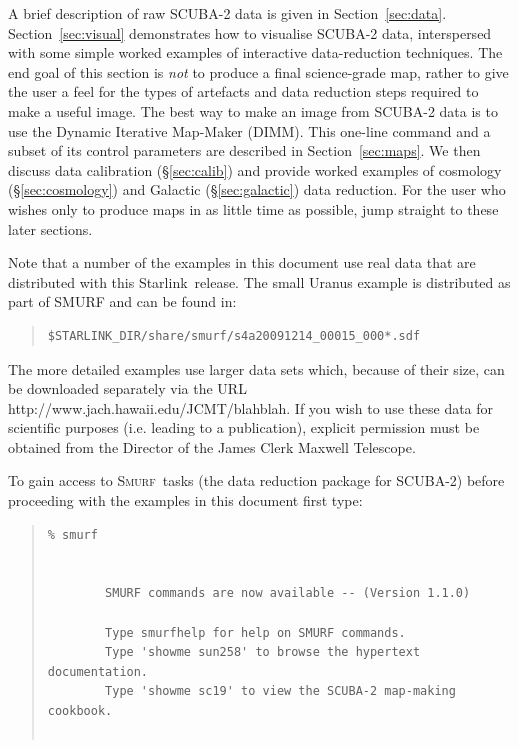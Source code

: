 \documentclass[twoside,11pt]{article}
\newcommand{\htmladdnormallink}[2]{#1}
\newcommand{\xref}[3]{#1}
\renewcommand{\_}{\texttt{\symbol{95}}}
\newenvironment{myquote}{\begin{quote}\begin{small}}{\end{small}\end{quote}}
\newcommand{\starlink}{\htmladdnormallink{Starlink}{http://starlink.jach.hawaii.edu}}
\newcommand{\smurf}{\xref{\textsc{Smurf}}{sun258}{}}
\begin{document}
A brief description of raw SCUBA-2 data is given in
Section~\ref{sec:data}. Section~\ref{sec:visual} demonstrates how to
visualise SCUBA-2 data, interspersed with some simple worked examples
of interactive data-reduction techniques. The end goal of this section
is {\em not} to produce a final science-grade map, rather to give the
user a feel for the types of artefacts and data reduction steps
required to make a useful image. The best way to make an image from
SCUBA-2 data is to use the Dynamic Iterative Map-Maker (DIMM). This
one-line command and a subset of its control parameters are described
in Section~\ref{sec:maps}. We then discuss data calibration
(\S\ref{sec:calib}) and provide worked examples of cosmology
(\S\ref{sec:cosmology}) and Galactic (\S\ref{sec:galactic}) data
reduction. For the user who wishes only to produce maps in as little
time as possible, jump straight to these later sections.

Note that a number of the examples in this document use real data that
are distributed with this \starlink\ release. The small Uranus example
is distributed as part of SMURF and can be found in:

\begin{myquote}
\begin{verbatim}
$STARLINK_DIR/share/smurf/s4a20091214_00015_000*.sdf
\end{verbatim}
\end{myquote}

The more detailed examples use larger data sets which, because of
their size, can be downloaded separately via the URL
\htmladdnormallink{http://www.jach.hawaii.edu/JCMT/blahblah}{http://www.jach.hawaii.edu/JCMT/blahblah}.
If you wish to use these data for scientific purposes (i.e. leading to
a publication), explicit permission must be obtained from the Director
of the James Clerk Maxwell Telescope.

To gain access to \smurf\ tasks (the data reduction package for
SCUBA-2) before proceeding with the examples in this document first
type:

\begin{myquote}
\begin{verbatim}
% smurf


        SMURF commands are now available -- (Version 1.1.0)

        Type smurfhelp for help on SMURF commands.
        Type 'showme sun258' to browse the hypertext documentation.
        Type 'showme sc19' to view the SCUBA-2 map-making cookbook.


\end{verbatim}
\end{myquote}
%
\end{document}
